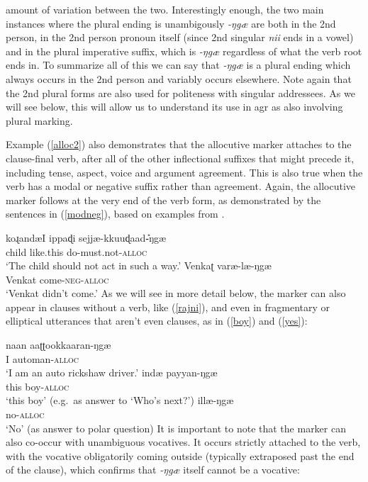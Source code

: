 \documentclass[output=paper, modfonts, nonflat]{langsci/langscibook}
\begin{document}
amount of variation between the two. Interestingly enough, the two
main instances where the plural ending is unambigously \textit{-ŋgæ}
are both in the 2nd person, in the 2nd person pronoun itself (since
2nd singular \textit{nii} ends in a vowel) and in the plural
imperative suffix, which is \textit{-ŋgæ} regardless of what the verb
root ends in. To summarize all of this we can say that \textit{-ŋgæ}
is a plural ending which always occurs in the 2nd person and variably
occurs elsewhere. Note again that the 2nd plural forms are also used
for politeness with singular addressees. As we will see below, this
will allow us to understand its use in agr{} as also involving
plural marking. 

Example (\ref{alloc2}) also demonstrates that the allocutive marker
attaches to the clause-final verb, after all of the other inflectional
suffixes that might precede it, including tense, aspect, voice and
argument agreement. This is also true when the verb has a modal or
negative suffix rather than agreement. Again, the allocutive marker
follows at the very end of the verb form, as demonstrated by the
sentences in (\ref{modneg}), based on examples from
\citet{amrit:1991}.

\ea\label{modneg}
 \ea\label{modal}\gll koɻandæI{} ippaɖi sejjæ-kkuuɖaad\U-ŋgæ\\ 
 child {like.this} do-{must.not}-\textsc{alloc}\\
 \glt `The child should not act in such a way.'
 \ex\label{neg}\gll Venkaʈ varæ-læ-ŋgæ\\
 Venkat come-\textsc{neg}-\textsc{alloc}\\
 \glt `Venkat didn't come.'
 \z
\z
%
As we will see in more detail below, the marker can also appear in
clauses without a verb, like (\ref{rajni}), and even in fragmentary or
elliptical utterances that aren't even clauses, as in (\ref{boy}) and
(\ref{yes}):

\ea\label{short}
 \ea\label{rajni}\gll naan aaʈʈookkaaran-ŋgæ\\
 I automan-\textsc{alloc}\\
 \glt `I am an auto rickshaw driver.'
 \ex\label{boy}\gll indæ{} payyan-ŋgæ\\
 this boy-\textsc{alloc}\\
 \glt `this boy' (e.g.\ as answer to `Who's next?')
 \ex\label{yes}\gll illæ-ŋgæ\\
 no-\textsc{alloc}\\
 \glt `No' (as answer to polar question)
 \z
\z
%
It is important to note that the \allagr{} marker can also co-occur
with unambiguous vocatives. It occurs strictly attached to the verb,
with the vocative obligatorily coming outside (typically extraposed
past the end of the clause), which confirms that \textit{-ŋgæ} itself
cannot be a vocative:
\end{document}
